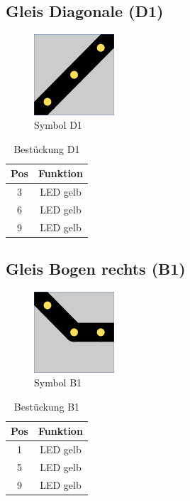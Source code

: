 \documentclass[10pt,a4paper]{article}
\begin{document}
\subsection{Gleis Diagonale (D1)}
\begin{figure}[hbtp]
\centering
\includegraphics[width=3cm]{../folien/d1.png}
\caption{Symbol D1}
\end{figure}
\begin{table}[h!]
\centering
\begin{tabular}{c|c}
\textbf{Pos} & \textbf{Funktion} \\ \hline
3 & LED gelb \\
6 & LED gelb \\
9 & LED gelb
\end{tabular}
\caption{Bestückung D1}
\end{table}


\subsection{Gleis Bogen rechts (B1)}
\begin{figure}[H]
\centering
\includegraphics[width=3cm]{../folien/b1.png}
\caption{Symbol B1}
\end{figure}
\begin{table}[h!]
\centering
\begin{tabular}{c|c}
\textbf{Pos} & \textbf{Funktion} \\ \hline
1 & LED gelb \\
5 & LED gelb \\
9 & LED gelb
\end{tabular}
\caption{Bestückung B1}
\end{table}
\end{document}
